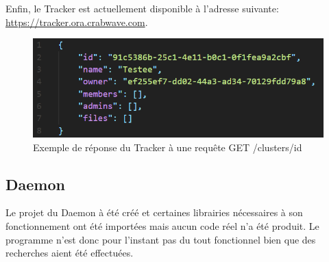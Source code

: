 \documentclass[11pt, a4paper]{report}
\newcommand*{\surl}[1]{{\bodyfont\color{clearocean}\selectfont\url{#1}}}
\begin{document}
      Enfin, le Tracker est actuellement disponible à l'adresse suivante: \surl{https://tracker.ora.crabwave.com}.

      \begin{figure}[H]
        \centering
        \includegraphics[width=15cm]{assets/presentation1/tracker_request.png}
        \caption{Exemple de réponse du Tracker à une requête GET /clusters/id}
      \end{figure}
    
    \subsection{Daemon}
      Le projet du Daemon à été créé et certaines librairies nécessaires à son fonctionnement ont été importées mais aucun code réel n'a été produit. Le programme n'est donc pour l'instant pas du tout fonctionnel bien que des recherches aient été effectuées.
\end{document}
